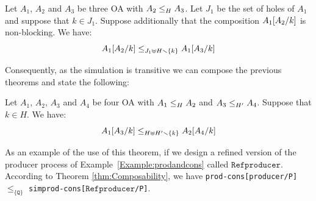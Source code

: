 \documentclass[runningheads]{llncs}
\begin{document}
\begin{theorem}[Congruence]\label{thm:CongurenceRefinement}
Let $A_1$, $A_2$ and $A_3$ be three OA with $\wrel{A_2}{A_3}{H}$. 
  Let $J_1$ be the set of holes of $A_1$ and suppose that \(k \in J_1\). Suppose additionally that the composition $A_1\subst{A_2}{k}$ is non-blocking.
We have: \[\wrel{A_1\subst{A_2}{k}}{A_1\subst{A_3}{k}}{J_1 \uplus H \setminus \mbrc{k}}\]
\end{theorem}

Consequently, as the simulation is transitive we can compose the previous theorems and  state the following: 
\begin{theorem}[Composability]\label{thm:Composability}
Let $A_1$, $A_2$, $A_3$ and $A_4$ be four OA with $\wrel{A_1}{A_2}{H}$ and $\wrel{A_3}{A_4}{H'}$.  Suppose that \(k \in H\). We have: \[\wrel{A_1\subst{A_3}{k}}{A_2\subst{A_4}{k}}{ H \uplus H'\setminus \mbrc{k}}\]
\end{theorem}

\begin{example}
As an example of the use of this theorem, if we design a refined version of the producer process of Example~\ref{Example:prodandcons} called $\texttt{Refproducer}$. According to  Theorem \ref{thm:Composability}, we have 
\texttt{prod-cons[producer/P]} $\leq_{\{\texttt{Q}\}}$  \texttt{simprod-cons[$\texttt{Refproducer}$/P]}. 
\end{example}






\end{document}
